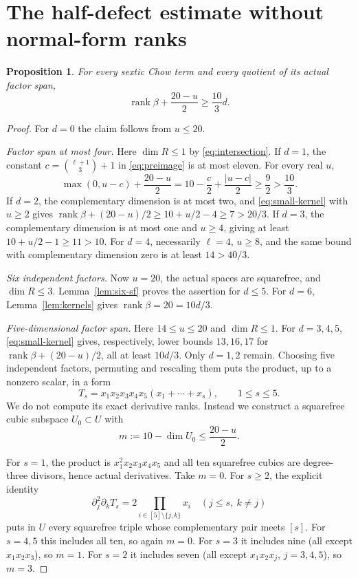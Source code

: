 \documentclass[11pt]{amsart}
\newtheorem{proposition}[theorem]{Proposition}
\theoremstyle{remark}\newtheorem{remark}[theorem]{Remark}
\numberwithin{equation}{section}
\newcommand{\rank}{\operatorname{rank}}
\newcommand{\dd}{\partial}
\begin{document}
\section{The half-defect estimate without normal-form ranks}
\begin{proposition}\label{prop:local}
For every sextic Chow term and every quotient of its actual factor span,
\begin{equation}\label{eq:local}
 \boxed{\rank\beta+\frac{20-u}{2}\ge\frac{10}{3}d.}
\end{equation}
\end{proposition}
\begin{proof}
For $d=0$ the claim follows from $u\le20$.

\smallskip\noindent\textit{Factor span at most four.}
Here $\dim R\le1$ by \eqref{eq:intersection}.
If $d=1$, the constant
$c=\binom{\ell+1}{3}+1$ in \eqref{eq:preimage} is at most eleven. For
every real $u$,
\[
 \max(0,u-c)+\frac{20-u}{2}
 =10-\frac c2+\frac{|u-c|}{2}\ge\frac92>\frac{10}{3}.
\]
If $d=2$, the complementary dimension is at most two, and
\eqref{eq:small-kernel} with $u\ge2$ gives
$\rank\beta+(20-u)/2\ge10+u/2-4\ge7>20/3$.
If $d=3$, the complementary dimension is at most one and $u\ge4$,
giving at least $10+u/2-1\ge11>10$.
For $d=4$, necessarily $\ell=4$, $u\ge8$, and the same bound with
complementary dimension zero is at least $14>40/3$.

\smallskip\noindent\textit{Six independent factors.}
Now $u=20$, the actual spaces are squarefree, and $\dim R\le3$.
Lemma~\ref{lem:six-sf} proves the assertion for $d\le5$.
For $d=6$, Lemma~\ref{lem:kernels} gives $\rank\beta=20=10d/3$.

\smallskip\noindent\textit{Five-dimensional factor span.}
Here $14\le u\le20$ and $\dim R\le1$.
For $d=3,4,5$, \eqref{eq:small-kernel} gives, respectively, lower
bounds $13,16,17$ for $\rank\beta+(20-u)/2$, all at least $10d/3$.
Only $d=1,2$ remain. Choosing five independent factors, permuting and
rescaling them puts the product, up to a nonzero scalar, in a form
\begin{equation}\label{eq:normal}
 T_s=x_1x_2x_3x_4x_5(x_1+\cdots+x_s),\qquad1\le s\le5.
\end{equation}
We do not compute its exact derivative ranks. Instead we construct a
squarefree cubic subspace $U_0\subset U$ with
\begin{equation}\label{eq:budget}
 m:=10-\dim U_0\le\frac{20-u}{2}.
\end{equation}

For $s=1$, the product is $x_1^2x_2x_3x_4x_5$ and all ten squarefree
cubics are degree-three divisors, hence actual derivatives. Take $m=0$.
For $s\ge2$, the explicit identity
\[
 \dd_j^2\dd_k T_s=2\prod_{i\in[5]\setminus\{j,k\}}x_i
 \quad(j\le s,\ k\ne j)
\]
puts in $U$ every squarefree triple whose complementary pair meets $[s]$.
For $s=4,5$ this includes all ten, so again $m=0$.
For $s=3$ it includes nine (all except $x_1x_2x_3$), so $m=1$.
For $s=2$ it includes seven (all except $x_1x_2x_j$, $j=3,4,5$),
so $m=3$.


\end{proof}
\end{document}
